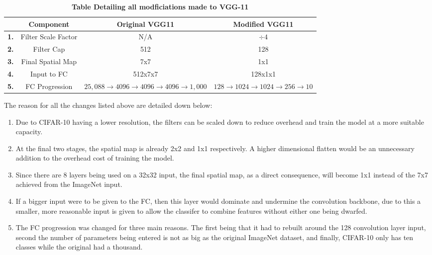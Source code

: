 \documentclass[a4paper]{article}
\begin{document}
\begin{table}[H]
    \centering
    \label{tab:vgg11xChanges}
    \caption{\textbf{Table Detailing all modficiations made to VGG-11}}
    \begin{tabular}{| c || c | c | c |}
        \hline 
        & \textbf{Component} & \textbf{Original VGG11} & \textbf{Modified VGG11} \\
        \hline
        \textbf{1.} & Filter Scale Factor & N/A & $\div 4$ \\
        \hline
        \textbf{2.} & Filter Cap & 512 & 128 \\
        \hline
        \textbf{3.} & Final Spatial Map & 7x7 & 1x1 \\
        \hline
        \textbf{4.} & Input to FC & 512x7x7 & 128x1x1 \\
        \hline
        \textbf{5.} & FC Progression & $25,088 \rightarrow 4096 \rightarrow 4096 \rightarrow 4096 \rightarrow 1,000$ & $128 \rightarrow 1024 \rightarrow 1024 \rightarrow 256 \rightarrow 10$ \\
        \hline
    \end{tabular}
\end{table}

The reason for all the changes listed above are detailed down below:
\begin{enumerate}
    \item Due to CIFAR-10 having a lower resolution, the filters can be scaled down to reduce overhead and train the model at a more suitable capacity.
    \item At the final two stages, the spatial map is already 2x2 and 1x1 respectively. A higher dimensional flatten would be an unnecessary addition to the overhead cost of training the model.
    \item Since there are 8 layers being used on a 32x32 input, the final spatial map, as a direct consequence, will become 1x1 instead of the 7x7 achieved from the ImageNet input.
    \item If a bigger input were to be given to the FC, then this layer would dominate and undermine the convolution backbone, due to this a smaller, more reasonable input is given to allow the classifer to combine features without either one being dwarfed.
    \item The FC progression was changed for three main reasons. The first being that it had to rebuilt around the 128 convolution layer input, second the number of parameters being entered is not as big as the original ImageNet dataset, and finally, CIFAR-10 only has ten classes while the original had a thousand.
\end{enumerate}
\end{document}
